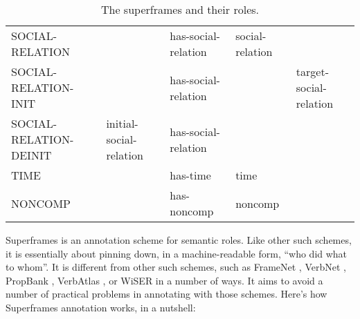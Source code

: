 \documentclass[a4paper]{article}
\newcommand{\fr}[1]{\textsf{#1}}
\newcommand{\rl}[1]{\textsf{#1}}
\begin{document}
\begin{table}
{\begin{tabular}{lllll}
            \fr{SOCIAL-RELATION} & & \rl{has-social-relation} & \rl{social-relation} & \\
            \fr{SOCIAL-RELATION-INIT} & & \rl{has-social-relation} & & \rl{target-social-relation} \\
            \fr{SOCIAL-RELATION-DEINIT} & \rl{initial-social-relation} & \rl{has-social-relation} & & \\
            \fr{TIME} & & \rl{has-time} & \rl{time} & \\
            \midrule
            \fr{NONCOMP} & & \rl{has-noncomp} & \rl{noncomp} \\
            \bottomrule
        \end{tabular}
    }
    \caption{The superframes and their roles.}
    \label{tab:superframes}
\end{table}

Superframes is an annotation scheme for semantic roles. Like other such
schemes, it is essentially about pinning down, in a machine-readable form,
``who did what to whom''. It is different from other such schemes, such as
FrameNet \citep{baker-etal-1998-berkeley}, VerbNet
\citep{kipper-schuler-2005-verbnet}, PropBank
\citep{palmer-etal-2005-proposition}, VerbAtlas
\citep{di-fabio-etal-2019-verbatlas}, or WiSER \citep{feng-etal-2022-widely} in
a number of ways. It aims to avoid a number of practical problems in annotating
with those schemes. Here's how Superframes annotation works, in a nutshell:
\end{document}
